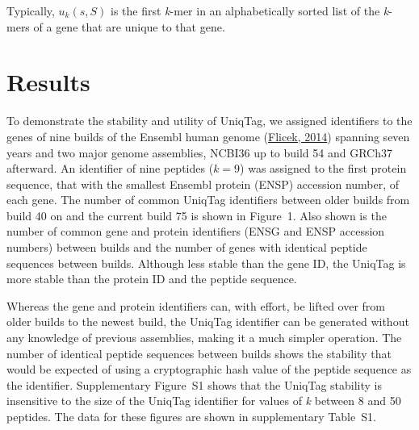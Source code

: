 \documentclass{bioinfo}
\begin{document}
Typically, $u_k(s, S)$ is the first \emph{k}-mer in an alphabetically
sorted list of the \emph{k}-mers of a gene that are unique to that gene.

\section{Results}\label{results}

To demonstrate the stability and utility of UniqTag, we assigned
identifiers to the genes of nine builds of the Ensembl human genome
(\href{http://dx.doi.org/10.1093/nar/gkt1196}{Flicek, 2014}) spanning
seven years and two major genome assemblies, NCBI36 up to build 54 and
GRCh37 afterward. An identifier of nine peptides ($k=9$) was assigned to
the first protein sequence, that with the smallest Ensembl protein
(ENSP) accession number, of each gene. The number of common UniqTag
identifiers between older builds from build 40 on and the current build
75 is shown in Figure~1. Also shown is the number of common gene and
protein identifiers (ENSG and ENSP accession numbers) between builds and
the number of genes with identical peptide sequences between builds.
Although less stable than the gene ID, the UniqTag is more stable than
the protein ID and the peptide sequence.

Whereas the gene and protein identifiers can, with effort, be lifted
over from older builds to the newest build, the UniqTag identifier can
be generated without any knowledge of previous assemblies, making it a
much simpler operation. The number of identical peptide sequences
between builds shows the stability that would be expected of using a
cryptographic hash value of the peptide sequence as the identifier.
Supplementary Figure~S1 shows that the UniqTag stability is insensitive
to the size of the UniqTag identifier for values of \emph{k} between 8
and 50 peptides. The data for these figures are shown in supplementary
Table~S1.
\end{document}
